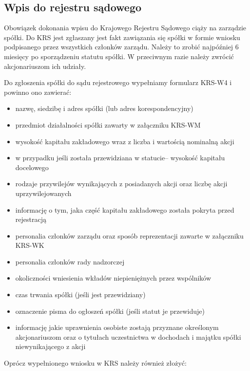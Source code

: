 \documentclass[11pt]{article}
\begin{document}
	\subsection{Wpis do rejestru sądowego}
	
	Obowiązek dokonania wpisu do Krajowego Rejestru Sądowego ciąży na zarządzie spółki. Do KRS jest zgłaszany jest fakt zawiązania się spółki w formie wniosku podpisanego przez wszystkich członków zarządu. Należy to zrobić najpóźniej 6 miesięcy po sporządzeniu statutu spółki. W przeciwnym razie należy zwrócić akcjonariuszom ich udziały.
	
Do zgłoszenia spółki do sądu rejestrowego wypełniamy formularz KRS-W4 i powinno ono zawierać:
	\begin{itemize}
	
	\item nazwę, siedzibę i adres spółki (lub adres korespondencyjny)
	\item przedmiot działalności spółki zawarty w załączniku KRS-WM
	\item wysokość kapitału zakładowego wraz z liczba i wartością nominalną akcji
	\item w przypadku jeśli została przewidziana w statucie– wysokość kapitału docelowego
	\item rodzaje przywilejów wynikających z posiadanych akcji oraz liczbę akcji uprzywilejowanych
	\item informację o tym, jaka część kapitału zakładowego została pokryta przed rejestracją 
	\item personalia członków zarządu oraz sposób reprezentacji zawarte w załączniku KRS-WK
	\item personalia członków rady nadzorczej
	\item okoliczności wniesienia wkładów niepieniężnych przez wspólników
	\item czas trwania spółki (jeśli jest przewidziany)
	\item oznaczenie pisma do ogłoszeń spółki (jeśli statut je przewiduje)
	\item informację jakie uprawnienia osobiste zostają przyznane określonym akcjonariuszom oraz o tytułach uczestnictwa w dochodach i majątku spółki niewynikającego z akcji

	\end{itemize}
	
	Oprócz wypełnionego wniosku w KRS należy również złożyć:
	
\end{document}
